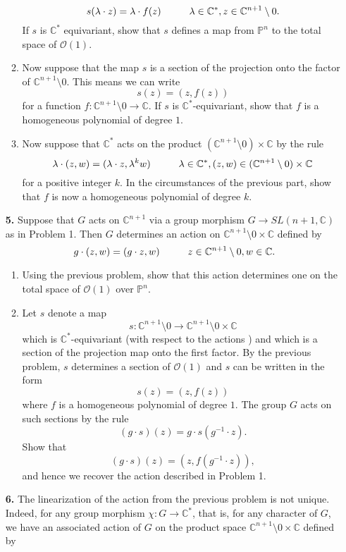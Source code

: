\documentclass[12pt]{article}
\theoremstyle{definition}
\theoremstyle{theorem}
\begin{document}
\begin{enumerate}
\begin{enumerate}
\[
s(\lambda \cdot z) = \lambda \cdot f(z) \hspace{10mm} \lambda \in \mathbb{C}^*, z \in \mathbb{C}^{n+1} \setminus 0.
\]
If $s$ is $\mathbb{C}^*$ equivariant, show that $s$ defines a map from $\mathbb{P}^n$ to the total space of $\mathcal{O}(1)$. 
\item Now suppose that the map $s$ is a section of the projection onto the factor of $\mathbb{C}^{n+1} \setminus 0$. This means we can write 
\[
s(z) = (z, f(z))
\]
for a function $f : \mathbb{C}^{n+1}\setminus 0 \to \mathbb{C}$. If $s$ is $\mathbb{C}^*$-equivariant, show that $f$ is a homogeneous polynomial of degree $1$.  
\item  Now suppose that $\mathbb{C}^*$ acts on the product $(\mathbb{C}^{n+1}\setminus 0) \times \mathbb{C}$ by the rule 
\[
\lambda \cdot (z, w) = (\lambda \cdot z, \lambda^k w) \hspace{10mm} \lambda \in \mathbb{C}^*, (z,w) \in(\mathbb{C}^{n+1}\setminus 0) \times \mathbb{C}
\]
for a positive integer $k$. In the circumstances of the previous part, show that $f$ is now a homogeneous polynomial of degree $k$. 
\end{enumerate}
\item[\textbf{5.}] Suppose that $G$ acts on $\mathbb{C}^{n+1}$ via a group morphism $G \to SL(n+1, \mathbb{C})$ as in Problem 1. Then $G$ determines an action on $\mathbb{C}^{n+1}\setminus 0 \times \mathbb{C}$ defined by 
\[
g \cdot (z, w) = (g \cdot z, w) \hspace{10mm} z \in \mathbb{C}^{n+1}\setminus 0, w \in \mathbb{C}.
\]
\begin{enumerate}
\item Using the previous problem, show that this action determines one on the total space of $\mathcal{O}(1)$ over $\mathbb{P}^n$. 
\item Let $s$ denote a map 
\[
s : \mathbb{C}^{n+1} \setminus 0 \to \mathbb{C}^{n+1} \setminus 0 \times \mathbb{C}
\]
which is $\mathbb{C}^*$-equivariant (with respect to the actions ) and which is a section of the projection map onto the first factor. By the previous problem, $s$ determines a section of $\mathcal{O}(1)$ and $s$ can be written in the form 
\[
s(z) = (z,f(z))
\]
where $f$ is a homogeneous polynomial of degree $1$. The group $G$ acts on such sections by the rule 
\[
(g \cdot s)(z) = g \cdot s(g^{-1} \cdot z).
\]
Show that 
\[
(g \cdot s)(z) = (z, f(g^{-1} \cdot z)),
\]
and hence we recover the action described in Problem 1. 
\end{enumerate}
\item[\textbf{6.}] The linearization of the action from the previous problem is not unique. Indeed, for any group morphism $\chi : G \to \mathbb{C}^*$, that is, for any character of $G$, we have an associated action of $G$ on the product space $\mathbb{C}^{n+1} \setminus 0 \times \mathbb{C}$ defined by 

\end{enumerate}
\end{document}
